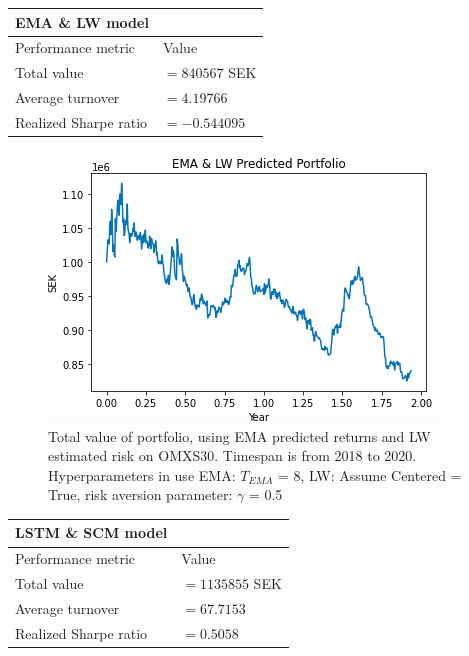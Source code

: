 \documentclass[final]{LTHtwocol} %
\begin{document}
\begin{center}
 \begin{tabular}{||l l||} 
 \hline
 \textbf{EMA \& LW  model} & \\ [0.5ex] 
 \hline
 Performance metric & Value\\ [0.5ex] 
 \hline\hline
 Total value & $=840567$ SEK \\ 
 \hline
 Average turnover& $=4.19766$ \\
 \hline
 Realized Sharpe ratio & $=-0.544095$ \\  [1ex] 
 \hline
\end{tabular}
\label{tab:EMA and LW data}
\end{center}

\begin{figure}[h!]
	\centering
	\includegraphics[width=0.8\columnwidth]{Pics/result/EMA_LW_Diagram.png}
	\caption{Total value of portfolio, using EMA predicted returns and LW estimated risk on OMXS30. Timespan is from 2018 to 2020. Hyperparameters in use EMA: $T_{EMA}$ = 8, LW: Assume Centered = True, risk aversion parameter: $\gamma$ = 0.5}
	\label{fig:EMALW} 
\end{figure}

\newpage

\begin{center}
 \begin{tabular}{||l l||} 
 \hline
 \textbf{LSTM \& SCM  model} & \\ [0.5ex] 
 \hline
 Performance metric & Value\\ [0.5ex] 
 \hline\hline
 Total value & $=1135855$ SEK \\ 
 \hline
 Average turnover& $=67.7153$ \\
 \hline
 Realized Sharpe ratio & $=0.5058$ \\  [1ex] 
 \hline
\end{tabular}
\label{tab:EMA and LW data}
\end{center}
\end{document}
